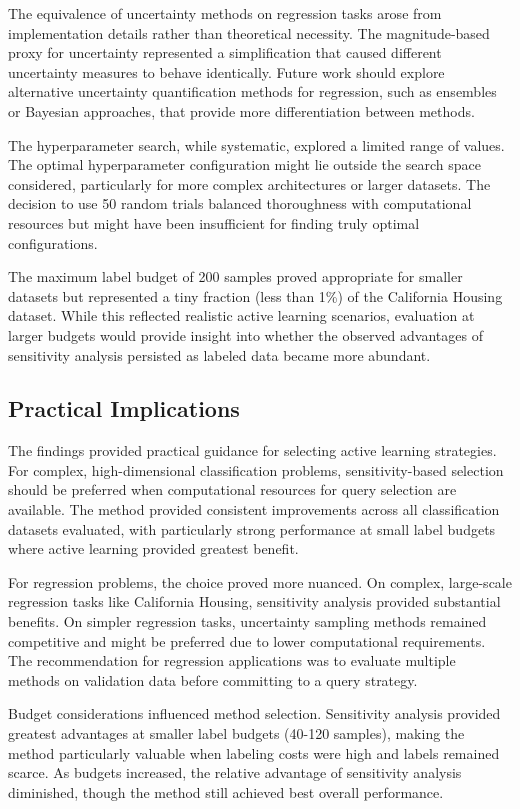 \documentclass[conference]{IEEEtran}
\begin{document}
The equivalence of uncertainty methods on regression tasks arose from implementation details rather than theoretical necessity. The magnitude-based proxy for uncertainty represented a simplification that caused different uncertainty measures to behave identically. Future work should explore alternative uncertainty quantification methods for regression, such as ensembles or Bayesian approaches, that provide more differentiation between methods.

The hyperparameter search, while systematic, explored a limited range of values. The optimal hyperparameter configuration might lie outside the search space considered, particularly for more complex architectures or larger datasets. The decision to use 50 random trials balanced thoroughness with computational resources but might have been insufficient for finding truly optimal configurations.

The maximum label budget of 200 samples proved appropriate for smaller datasets but represented a tiny fraction (less than 1\%) of the California Housing dataset. While this reflected realistic active learning scenarios, evaluation at larger budgets would provide insight into whether the observed advantages of sensitivity analysis persisted as labeled data became more abundant.

\subsection{Practical Implications}

The findings provided practical guidance for selecting active learning strategies. For complex, high-dimensional classification problems, sensitivity-based selection should be preferred when computational resources for query selection are available. The method provided consistent improvements across all classification datasets evaluated, with particularly strong performance at small label budgets where active learning provided greatest benefit.

For regression problems, the choice proved more nuanced. On complex, large-scale regression tasks like California Housing, sensitivity analysis provided substantial benefits. On simpler regression tasks, uncertainty sampling methods remained competitive and might be preferred due to lower computational requirements. The recommendation for regression applications was to evaluate multiple methods on validation data before committing to a query strategy.

Budget considerations influenced method selection. Sensitivity analysis provided greatest advantages at smaller label budgets (40-120 samples), making the method particularly valuable when labeling costs were high and labels remained scarce. As budgets increased, the relative advantage of sensitivity analysis diminished, though the method still achieved best overall performance.
\end{document}
